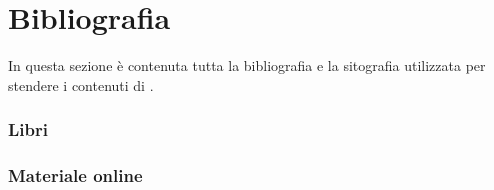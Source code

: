 \section{Bibliografia}
In questa sezione è contenuta tutta la bibliografia e la sitografia utilizzata per stendere i contenuti di \ProjectTitle{}.

\nocite{*}
\subsubsection{Libri}
\printbibliography[heading=none,type=book]
\subsubsection{Materiale online}
\printbibliography[heading=none,type=online]